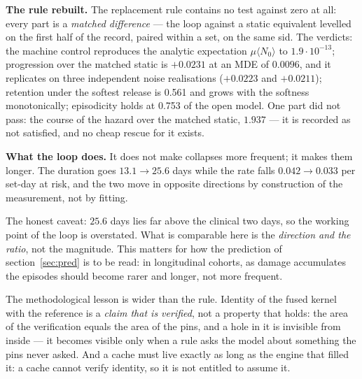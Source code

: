 \textbf{The rule rebuilt.} The replacement rule contains no test against zero at all: every part is a \emph{matched difference} --- the loop against a static equivalent levelled on the first half of the record, paired within a set, on the same sid. The verdicts: the machine control reproduces the analytic expectation $\mu\langle N_0\rangle$ to $1.9\cdot10^{-13}$; progression over the matched static is $+0.0231$ at an MDE of $0.0096$, and it replicates on three independent noise realisations ($+0.0223$ and $+0.0211$); retention under the softest release is 0.561 and grows with the softness monotonically; episodicity holds at 0.753 of the open model. One part did not pass: the course of the hazard over the matched static, $1.937$ --- it is recorded as not satisfied, and no cheap rescue for it exists.

\textbf{What the loop does.} It does not make collapses more frequent; it makes them longer. The duration goes $13.1\to25.6$ days while the rate falls $0.042\to0.033$ per set-day at risk, and the two move in opposite directions by construction of the measurement, not by fitting.

\begin{note}
The honest caveat: $25.6$ days lies far above the clinical two days, so the working point of the loop is overstated. What is comparable here is the \emph{direction and the ratio}, not the magnitude. This matters for how the prediction of section~\ref{sec:pred} is to be read: in longitudinal cohorts, as damage accumulates the episodes should become rarer and longer, not more frequent.
\end{note}

\begin{ineq}
The methodological lesson is wider than the rule. Identity of the fused kernel with the reference is a \emph{claim that is verified}, not a property that holds: the area of the verification equals the area of the pins, and a hole in it is invisible from inside --- it becomes visible only when a rule asks the model about something the pins never asked. And a cache must live exactly as long as the engine that filled it: a cache cannot verify identity, so it is not entitled to assume it.
\end{ineq}
